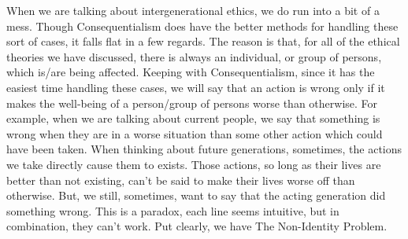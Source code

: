 
When we are talking about intergenerational ethics, we do run into a bit of a mess. Though Consequentialism does have the better methods for handling these sort of cases, it falls flat in a few regards. The reason is that, for all of the ethical theories we have discussed, there is always an individual, or group of persons, which is/are being affected. Keeping with Consequentialism, since it has the easiest time handling these cases, we will say that an action is wrong only if it makes the well-being of a person/group of persons worse than otherwise. For example, when we are talking about current people, we say that something is wrong when they are in a worse situation than some other action which could have been taken. When thinking about future generations, sometimes, the actions we take directly cause them to exists. Those actions, so long as their lives are better than not existing, can't be said to make their lives worse off than otherwise. But, we still, sometimes, want to say that the acting generation did something wrong. This is a paradox, each line seems intuitive, but in combination, they can't work. Put clearly, we have The Non-Identity Problem.
